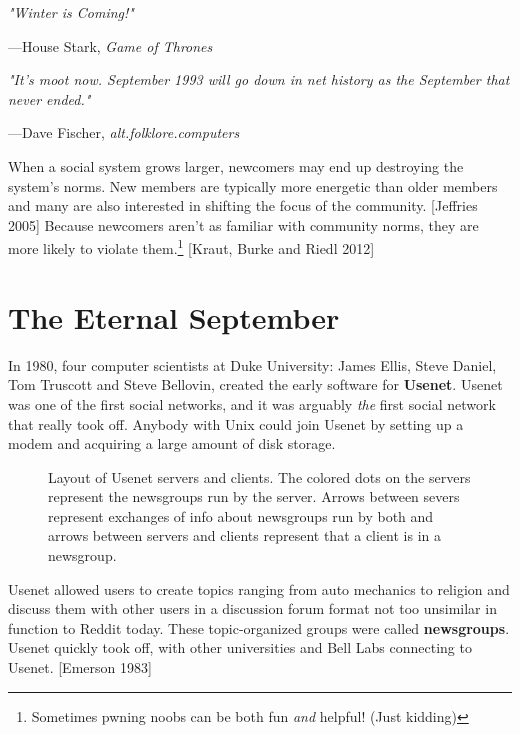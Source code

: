 \documentclass[class=book, crop=false]{standalone}
\providecommand{\keyterm}[1]{\textbf{#1}\marginnote{\scriptsize \textbf{#1}}}
\begin{document}
\epigraph{\itshape "Winter is Coming!"}{---House Stark, \textit{Game of Thrones}}

\epigraph{\itshape "It's moot now. September 1993 will go down in net history as the September that never ended."}{---Dave Fischer, \textit{alt.folklore.computers}}

When a social system grows larger, newcomers may end up destroying the system’s norms. New members are typically more energetic than older members and many are also interested in shifting the focus of the community. [Jeffries 2005] Because newcomers aren’t as familiar with community norms, they are more likely to violate them.\footnote{Sometimes pwning noobs can be both fun \textit{and} helpful! (Just kidding)} [Kraut, Burke and Riedl 2012]\\

\section{The Eternal September}

In 1980, four computer scientists at Duke University: James Ellis, Steve Daniel, Tom Truscott and Steve Bellovin, created the early software for \keyterm{Usenet}. Usenet was one of the first social networks, and it was arguably \textit{the} first social network that really took off. Anybody with Unix could join Usenet by setting up a modem and acquiring a large amount of disk storage.

\begin{figure}[h]
    \centering
    
    \caption{Layout of Usenet servers and clients. The colored dots on the servers represent the newsgroups run by the server. Arrows between severs represent exchanges of info about newsgroups run by both and arrows between servers and clients represent that a client is in a newsgroup.}
\end{figure}

Usenet allowed users to create topics ranging from auto mechanics to religion and discuss them with other users in a discussion forum format not too unsimilar in function to Reddit today. These topic-organized groups were called \keyterm{newsgroups}. Usenet quickly took off, with other universities and Bell Labs connecting to Usenet. [Emerson 1983]
\end{document}
